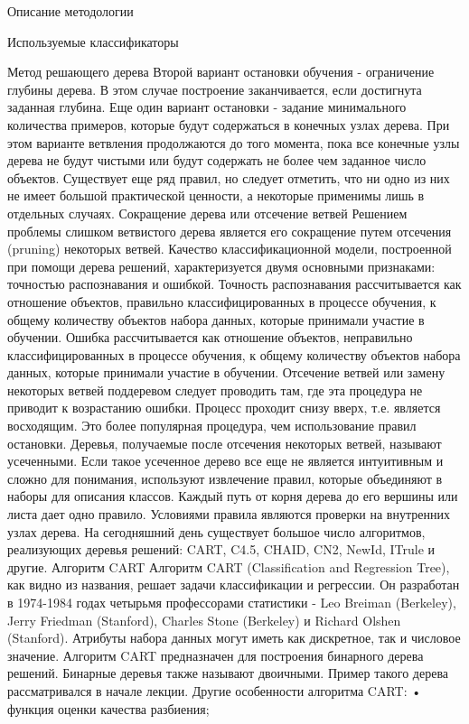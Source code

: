 \begin{section}{Описание методологии}
\begin{subsection}{Используемые классификаторы}
\begin{subsubsection}{Метод решающего дерева}
Второй вариант остановки обучения - ограничение глубины дерева. В этом случае построение заканчивается, если достигнута заданная глубина.
Еще один вариант остановки - задание минимального количества примеров, которые будут содержаться в конечных узлах дерева. При этом варианте ветвления продолжаются до того момента, пока все конечные узлы дерева не будут чистыми или будут содержать не более чем заданное число объектов.
Существует еще ряд правил, но следует отметить, что ни одно из них не имеет большой практической ценности, а некоторые применимы лишь в отдельных случаях.
Сокращение дерева или отсечение ветвей
Решением проблемы слишком ветвистого дерева является его сокращение путем отсечения (pruning) некоторых ветвей.
Качество классификационной модели, построенной при помощи дерева решений, характеризуется двумя основными признаками: точностью распознавания и ошибкой.
Точность распознавания рассчитывается как отношение объектов, правильно классифицированных в процессе обучения, к общему количеству объектов набора данных, которые принимали участие в обучении.
Ошибка рассчитывается как отношение объектов, неправильно классифицированных в процессе обучения, к общему количеству объектов набора данных, которые принимали участие в обучении.
Отсечение ветвей или замену некоторых ветвей поддеревом следует проводить там, где эта процедура не приводит к возрастанию ошибки. Процесс проходит снизу вверх, т.е. является восходящим. Это более популярная процедура, чем использование правил остановки. Деревья, получаемые после отсечения некоторых ветвей, называют усеченными.
Если такое усеченное дерево все еще не является интуитивным и сложно для понимания, используют извлечение правил, которые объединяют в наборы для описания классов. Каждый путь от корня дерева до его вершины или листа дает одно правило. Условиями правила являются проверки на внутренних узлах дерева.
На сегодняшний день существует большое число алгоритмов, реализующих деревья решений: CART, C4.5, CHAID, CN2, NewId, ITrule и другие.
Алгоритм CART
Алгоритм CART (Classification and Regression Tree), как видно из названия, решает задачи классификации и регрессии. Он разработан в 1974-1984 годах четырьмя профессорами статистики - Leo Breiman (Berkeley), Jerry Friedman (Stanford), Charles Stone (Berkeley) и Richard Olshen (Stanford).
Атрибуты набора данных могут иметь как дискретное, так и числовое значение.
Алгоритм CART предназначен для построения бинарного дерева решений. Бинарные деревья также называют двоичными. Пример такого дерева рассматривался в начале лекции.
Другие особенности алгоритма CART:
•	функция оценки качества разбиения;

\end{subsubsection}
\end{subsection}
\end{section}
